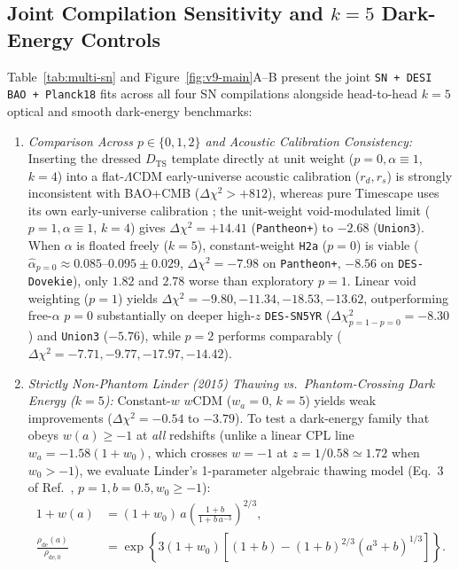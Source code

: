 \documentclass[11pt,a4paper]{article}
\begin{document}
\subsection{Joint Compilation Sensitivity and $k = 5$ Dark-Energy Controls}
Table~\ref{tab:multi-sn} and Figure~\ref{fig:v9-main}A--B present the joint \texttt{SN + DESI BAO + Planck18} fits across all four SN compilations alongside head-to-head $k = 5$ optical and smooth dark-energy benchmarks:
\begin{enumerate}
    \item \textit{Comparison Across $p \in \{0, 1, 2\}$ and Acoustic Calibration Consistency:} Inserting the dressed $D_{\mathrm{TS}}$ template directly at unit weight ($p = 0, \alpha \equiv 1$, $k = 4$) into a flat-$\Lambda$CDM early-universe acoustic calibration ($r_d, r_s$) is strongly inconsistent with BAO+CMB ($\Delta\chi^2 > +812$), whereas pure Timescape uses its own early-universe calibration \cite{Wiltshire2009PRD}; the unit-weight void-modulated limit ($p = 1, \alpha \equiv 1$, $k = 4$) gives $\Delta\chi^2 = +14.41$ (\texttt{Pantheon+}) to $-2.68$ (\texttt{Union3}). When $\alpha$ is floated freely ($k = 5$), constant-weight \texttt{H2a} ($p = 0$) is viable ($\hat{\alpha}_{p=0} \approx 0.085\text{--}0.095 \pm 0.029$, $\Delta\chi^2 = -7.98$ on \texttt{Pantheon+}, $-8.56$ on \texttt{DES-Dovekie}), only $1.82$ and $2.78$ worse than exploratory $p = 1$. Linear void weighting ($p = 1$) yields $\Delta\chi^2 = -9.80, -11.34, -18.53, -13.62$, outperforming free-$\alpha$ $p = 0$ substantially on deeper high-$z$ \texttt{DES-SN5YR} ($\Delta\chi^2_{p=1-p=0} = -8.30$) and \texttt{Union3} ($-5.76$), while $p = 2$ performs comparably ($\Delta\chi^2 = -7.71, -9.77, -17.97, -14.42$).
    \item \textit{Strictly Non-Phantom Linder (2015) Thawing vs.\ Phantom-Crossing Dark Energy ($k = 5$):} Constant-$w$ $w$CDM ($w_a = 0$, $k = 5$) yields weak improvements ($\Delta\chi^2 = -0.54$ to $-3.79$). To test a dark-energy family that obeys $w(a) \ge -1$ at \textit{all} redshifts (unlike a linear CPL line $w_a = -1.58(1+w_0)$, which crosses $w = -1$ at $z = 1/0.58 \simeq 1.72$ when $w_0 > -1$), we evaluate Linder's \cite{Linder2015Thawing} 1-parameter algebraic thawing model (Eq.~3 of Ref.~\cite{Linder2015Thawing}, $p = 1, b = 0.5, w_0 \ge -1$):
    \begin{equation}
    \begin{split}
        1 + w(a) &= (1 + w_0)\,a\left(\frac{1 + b}{1 + b\,a^{-3}}\right)^{2/3}, \\
        \frac{\rho_{\mathrm{de}}(a)}{\rho_{\mathrm{de},0}} &= \exp\!\left\{3(1+w_0)\left[(1+b) - (1+b)^{2/3}(a^3+b)^{1/3}\right]\right\}.

\end{split}
\end{equation}
\end{enumerate}
\end{document}
